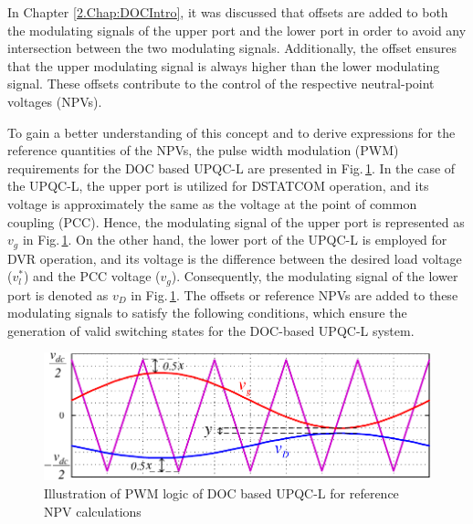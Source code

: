 In Chapter \ref{2.Chap:DOCIntro}, it was discussed that offsets are added to both the modulating signals of the upper port and the lower port in order to avoid any intersection between the two modulating signals. Additionally, the offset ensures that the upper modulating signal is always higher than the lower modulating signal. These offsets contribute to the control of the respective neutral-point voltages (NPVs).

To gain a better understanding of this concept and to derive expressions for the reference quantities of the NPVs, the pulse width modulation (PWM) requirements for the DOC based UPQC-L are presented in Fig.\,\ref{fig6.2}. In the case of the UPQC-L, the upper port is utilized for DSTATCOM operation, and its voltage is approximately the same as the voltage at the point of common coupling (PCC). Hence, the modulating signal of the upper port is represented as $v_g$ in Fig.\,\ref{fig6.2}. On the other hand, the lower port of the UPQC-L is employed for DVR operation, and its voltage is the difference between the desired load voltage ($v^{*}_{l}$) and the PCC voltage ($v_{g}$). Consequently, the modulating signal of the lower port is denoted as $v_{D}$ in Fig.\,\ref{fig6.2}. The offsets or reference NPVs are added to these modulating signals to satisfy the following conditions, which ensure the generation of valid switching states for the DOC-based UPQC-L system.
\begin{figure}[]   
	\centering
	\includegraphics[scale=1]{figures/Chapter_6/Mine/NPV_Calculations.pdf}
	\caption{Illustration of PWM logic of DOC based UPQC-L for reference NPV calculations}
	\label{fig6.2}
\end{figure}

